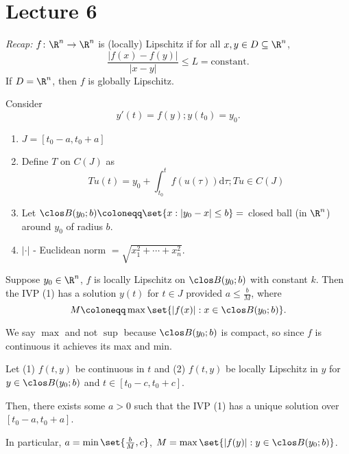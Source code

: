 \documentclass[class=article, crop=false]{standalone}
\begin{document}
\section{Lecture 6}

\textit{Recap:} $f \colon \R^n \to \R^n$ is (locally) Lipschitz if for all $x,y \in D \subseteq \R^n$,
    \[
        \frac{|f(x)-f(y)|}{|x-y|} \leq L = \text{constant}.
    \]
If $D = \R^n$, then $f$ is globally Lipschitz.

Consider
    \[
        y'(t)=f(y); y(t_0) = y_0 \tag{1}.
    \]

\begin{enumerate}[$\bullet$]
    \item $J = [t_0-a,t_0+a]$
    \item Define $T$ on $C(J)$ as
        \[
            Tu(t) = y_0 + \int_{t_0}^{t} f(u(\tau)) \mathrm{d}\tau; Tu \in C(J)
        \]

    \item Let $\clos B(y_0;b) \coloneqq \set{x : |y_0-x| \leq b} = $ closed ball (in $\R^n$) around $y_0$ of radius $b$.

    \item $| \cdot |$ - Euclidean norm $= \sqrt{x_1^2+ \cdots + x_n^2}$.
\end{enumerate}

\begin{thm}
    Suppose $y_0 \in \R^n$, $f$ is locally Lipschitz on $\clos B(y_0;b)$ with constant $k$. Then the IVP (1) has a solution $y(t)$ for $t \in J$ provided $a \leq \frac{b}{M}$, where
        \[
            M \coloneqq \max \set{|f(x)| : x \in \clos B(y_0;b)}.
        \]
\end{thm}
\begin{rem}
    We say $\max$ and not $\sup$ because $\clos B(y_0;b)$ is compact, so since $f$ is continuous it achieves its max and min.
\end{rem}

\begin{thm}
    Let (1) $f(t,y)$ be continuous in $t$ and (2) $f(t,y)$ be locally Lipschitz in $y$ for $y \in \clos B(y_0;b)$ and $t \in [t_0-c, t_0+c]$.

    Then, there exists some $a > 0$ such that the IVP (1) has a unique solution over $[t_0-a,t_0+a]$.

    In particular, $a = \min \set{\frac{b}{M},c}$, $M = \max \set{|f(y)| : y \in \clos B(y_0;b)}$.
\end{thm}
\end{document}
